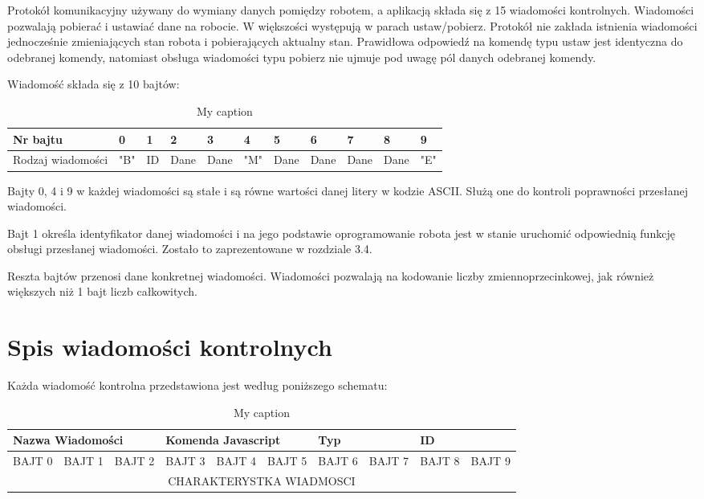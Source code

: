 \documentclass[eng,printmode]{mgr}
\begin{document}
Protokół komunikacyjny używany do wymiany danych pomiędzy robotem, a aplikacją składa się z 15 wiadomości kontrolnych. Wiadomości pozwalają  pobierać i ustawiać dane na robocie. W większości występują w parach ustaw/pobierz. Protokół nie zakłada istnienia wiadomości jednocześnie zmieniających stan robota i pobierających aktualny stan. Prawidłowa odpowiedź na komendę typu ustaw jest identyczna do odebranej komendy, natomiast obsługa wiadomości typu pobierz nie ujmuje pod uwagę pól danych odebranej komendy.

Wiadomość składa się z 10 bajtów:
\begin{table}[!htb]
\centering
\caption{My caption}
\label{my-label}
\begin{tabular}{|l|l|l|l|l|l|l|l|l|l|l|}
\hline
Nr bajtu          & 0   & 1  & 2    & 3    & 4   & 5    & 6    & 7    & 8    & 9   \\ \hline
Rodzaj wiadomości & "B" & ID & Dane & Dane & "M" & Dane & Dane & Dane & Dane & "E" \\ \hline
\end{tabular}
\end{table}

Bajty 0, 4 i 9 w każdej wiadomości  są stałe i są równe wartości danej litery w kodzie ASCII. Służą one do kontroli poprawności przesłanej wiadomości.

Bajt 1 określa identyfikator danej wiadomości i na jego podstawie oprogramowanie robota jest w stanie uruchomić odpowiednią funkcję obsługi przesłanej wiadomości. Zostało to zaprezentowane w rozdziale 3.4.

Reszta bajtów przenosi dane konkretnej wiadomości. Wiadomości pozwalają na kodowanie liczby zmiennoprzecinkowej, jak również większych niż 1 bajt liczb całkowitych.

 \section{Spis wiadomości kontrolnych}   

Każda wiadomość kontrolna przedstawiona jest według poniższego schematu:
\begin{table}[!htb]
\centering
\caption{My caption}
\label{my-label}
\begin{tabular}{|l|l|l|l|l|l|l|l|l|l|}
\hline
\multicolumn{3}{|l|}{Nazwa Wiadomości} & \multicolumn{3}{l|}{Komenda Javascript} & \multicolumn{2}{l|}{Typ} & \multicolumn{2}{l|}{ID} \\ \hline
BAJT 0      & BAJT 1      & BAJT 2     & BAJT 3      & BAJT 4      & BAJT 5      & BAJT 6      & BAJT 7     & BAJT 8     & BAJT 9     \\ \hline
\multicolumn{10}{|c|}{CHARAKTERYSTKA WIADMOSCI}                                                                                       \\ \hline
\end{tabular}
\end{table}
\end{document}
